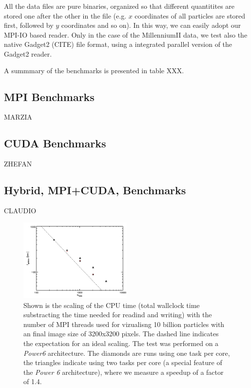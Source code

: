 All the data files are pure binaries, organized so that different quantitites are stored one after
the other in the file (e.g. $x$ coordinates of all particles are stored first, followed by $y$ 
coordinates and so on). In this way, we can easily adopt our MPI-IO based
reader. Only in the case of the MillenniumII data, we test also the native 
Gadget2 (CITE) file format, using a integrated parallel version of the Gadget2 reader.

A summmary of the benchmarks is presented in table XXX. 

\subsection{MPI Benchmarks}

MARZIA   
   
\subsection{CUDA Benchmarks}

ZHEFAN

\subsection{Hybrid, MPI+CUDA, Benchmarks}
   
CLAUDIO

\label{bench}

\begin{figure}
\begin{center}
\includegraphics[width=0.5\textwidth]{t_cpu.pdf}
\end{center}
\caption{Shown is the scaling of the CPU time (total wallclock time substracting the time needed for 
readind and writing) with the number of MPI threads used for vizualisng 10 billion particles with an final
image size of 3200x3200 pixels. The dashed line indicates the expectation for an ideal scaling. The test was 
performed on a {\it Power6} architecture. The diamonds are runs using one task per core, the triangles indicate
using two tasks per core (a special feature of the {\it Power 6} architecture), where we measure a speedup of 
a factor of 1.4.}\label{cpu_scaling}
\end{figure}

